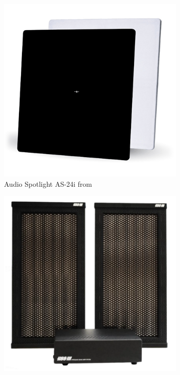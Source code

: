 \begin{figure}[!htb]
    \centering
    \begin{subfigure}{0.3\textwidth}
        \centering
        \includegraphics[width=\textwidth]{fig/CommercialProducts/As-24i.png}
        \caption{Audio Spotlight AS-24i from \cite{HolosonicsAudioSpotlight24i}}
    \end{subfigure}
    \hfill
    \begin{subfigure}{0.3\textwidth}
        \centering
        \includegraphics[width=\textwidth]{fig/CommercialProducts/Hypersound_resize.png}

\end{subfigure}
\end{figure}
